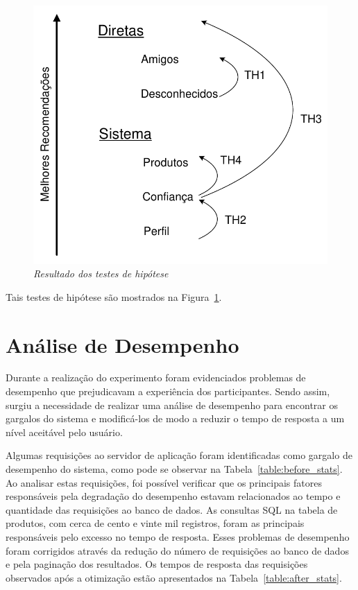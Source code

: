 \begin{figure}
    \centering
    \includegraphics[width=\textwidth]{imagens/testes}
    \caption{\it Resultado dos testes de hipótese}
    \label{fig:testes}
\end{figure}

 Tais testes de hipótese são mostrados na Figura~\ref{fig:testes}.

\section{Análise de Desempenho}
\label{sec:analise_de_desempenho}
Durante a realização do experimento foram evidenciados problemas de desempenho que prejudicavam a experiência dos participantes. Sendo assim, surgiu a necessidade de realizar uma análise de desempenho para encontrar os gargalos do sistema e modificá-los de modo a reduzir o tempo de resposta a um nível aceitável pelo usuário.

Algumas requisições ao servidor de aplicação foram identificadas como gargalo de desempenho do sistema, como pode se observar na Tabela~\ref{table:before_stats}. Ao analisar estas requisições, foi possível verificar que os principais fatores responsáveis pela degradação do desempenho estavam relacionados ao tempo e quantidade das requisições ao banco de dados. As consultas SQL na tabela de produtos, com cerca de cento e vinte mil registros, foram as principais responsáveis pelo excesso no tempo de resposta. Esses problemas de desempenho foram corrigidos através da redução do número de requisições ao banco de dados e pela paginação dos resultados. Os tempos de resposta das requisições observados após a otimização estão apresentados na Tabela~\ref{table:after_stats}.


